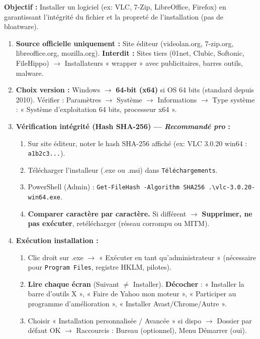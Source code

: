 \documentclass[11pt]{article}
\begin{document}
\begin{methode}
    \textbf{Objectif :} Installer un logiciel (ex: VLC, 7-Zip, LibreOffice, Firefox) en garantissant l'intégrité du fichier et la propreté de l'installation (pas de bloatware).
    \begin{enumerate}
        \item \textbf{Source officielle uniquement :} Site éditeur (videolan.org, 7-zip.org, libreoffice.org, mozilla.org). \textbf{Interdit :} Sites tiers (01net, Clubic, Softonic, FileHippo) $\rightarrow$ Installateurs « wrapper » avec publicitaires, barres outils, malware.
        \item \textbf{Choix version :} Windows $\rightarrow$ \textbf{64-bit (x64)} si OS 64 bits (standard depuis 2010). Vérifier : Paramètres $\rightarrow$ Système $\rightarrow$ Informations $\rightarrow$ Type système : « Système d'exploitation 64 bits, processeur x64 ».
        \item \textbf{Vérification intégrité (Hash SHA-256) — \emph{Recommandé pro} :}
              \begin{enumerate}
                  \item Sur site éditeur, noter le hash SHA-256 affiché (ex: VLC 3.0.20 win64 : \texttt{a1b2c3...}).
                  \item Télécharger l'installeur (.exe ou .msi) dans \texttt{Téléchargements}.
                  \item PowerShell (Admin) : \texttt{Get-FileHash -Algorithm SHA256 .\textbackslash vlc-3.0.20-win64.exe}.
                  \item \textbf{Comparer caractère par caractère.} Si différent $\rightarrow$ \textbf{Supprimer, ne pas exécuter}, retélécharger (réseau corrompu ou MITM).
              \end{enumerate}
        \item \textbf{Exécution installation :}
              \begin{enumerate}
                  \item Clic droit sur .exe $\rightarrow$ « Exécuter en tant qu'administrateur » (nécessaire pour \texttt{Program Files}, registre HKLM, pilotes).
                  \item \textbf{Lire chaque écran} (Suivant $\neq$ Installer). \textbf{Décocher} : « Installer la barre d'outils X », « Faire de Yahoo mon moteur », « Participer au programme d'amélioration », « Installer Avast/Chrome/Autre ».
                  \item Choisir « Installation personnalisée / Avancée » si dispo $\rightarrow$ Dossier par défaut OK $\rightarrow$ Raccourcis : Bureau (optionnel), Menu Démarrer (oui).

\end{enumerate}
\end{enumerate}
\end{methode}
\end{document}
